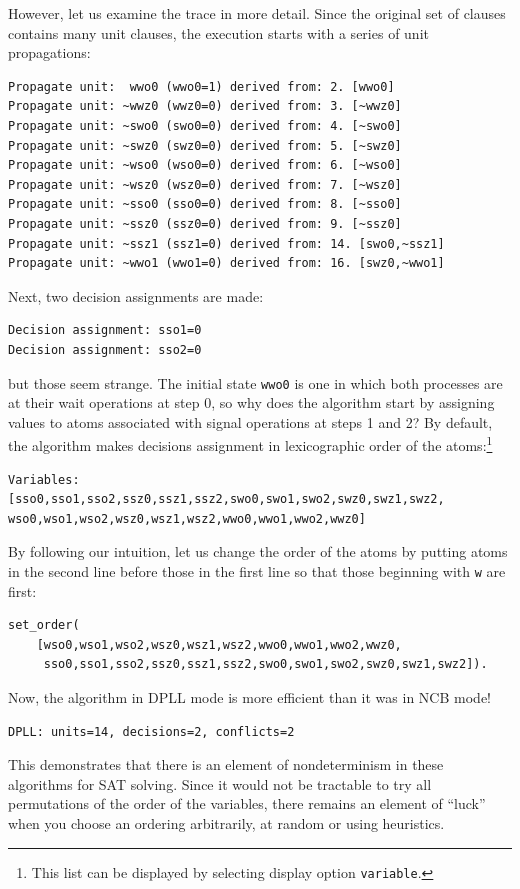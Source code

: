 \documentclass[11pt]{report}
\newcommand*{\p}[1]{\textup{\texttt{#1}}}
\begin{document}
However, let us examine the trace in more detail. Since the original set
of clauses contains many unit clauses, the execution starts with a
series of unit propagations:
\begin{verbatim}
Propagate unit:  wwo0 (wwo0=1) derived from: 2. [wwo0]
Propagate unit: ~wwz0 (wwz0=0) derived from: 3. [~wwz0]
Propagate unit: ~swo0 (swo0=0) derived from: 4. [~swo0]
Propagate unit: ~swz0 (swz0=0) derived from: 5. [~swz0]
Propagate unit: ~wso0 (wso0=0) derived from: 6. [~wso0]
Propagate unit: ~wsz0 (wsz0=0) derived from: 7. [~wsz0]
Propagate unit: ~sso0 (sso0=0) derived from: 8. [~sso0]
Propagate unit: ~ssz0 (ssz0=0) derived from: 9. [~ssz0]
Propagate unit: ~ssz1 (ssz1=0) derived from: 14. [swo0,~ssz1]
Propagate unit: ~wwo1 (wwo1=0) derived from: 16. [swz0,~wwo1]
\end{verbatim}
Next, two decision assignments are made:
\begin{verbatim}
Decision assignment: sso1=0
Decision assignment: sso2=0
\end{verbatim}
but those seem strange. The initial state \p{wwo0} is one in which both
processes are at their wait operations at step 0, so why does the
algorithm start by assigning values to atoms associated with signal
operations at steps 1 and 2? By default, the algorithm makes decisions
assignment in lexicographic order of the atoms:\footnote{This list can
be displayed by selecting display option \p{variable}.}
\begin{verbatim}
Variables: [sso0,sso1,sso2,ssz0,ssz1,ssz2,swo0,swo1,swo2,swz0,swz1,swz2,
wso0,wso1,wso2,wsz0,wsz1,wsz2,wwo0,wwo1,wwo2,wwz0]
\end{verbatim}
By following our
intuition, let us change the order of the atoms by putting atoms in the
second line before those in the first line so that those beginning with
\p{w} are first:
\begin{verbatim}
set_order(
    [wso0,wso1,wso2,wsz0,wsz1,wsz2,wwo0,wwo1,wwo2,wwz0,
     sso0,sso1,sso2,ssz0,ssz1,ssz2,swo0,swo1,swo2,swz0,swz1,swz2]).
\end{verbatim}
Now, the algorithm in DPLL mode is more efficient than it was in NCB
mode!
\begin{verbatim}
DPLL: units=14, decisions=2, conflicts=2
\end{verbatim}

This demonstrates that there is an element of nondeterminism in these
algorithms for SAT solving. Since it would not be tractable to try all
permutations of the order of the variables, there remains an element of
``luck'' when you choose an ordering arbitrarily, at random or using
 heuristics.



\end{document}
